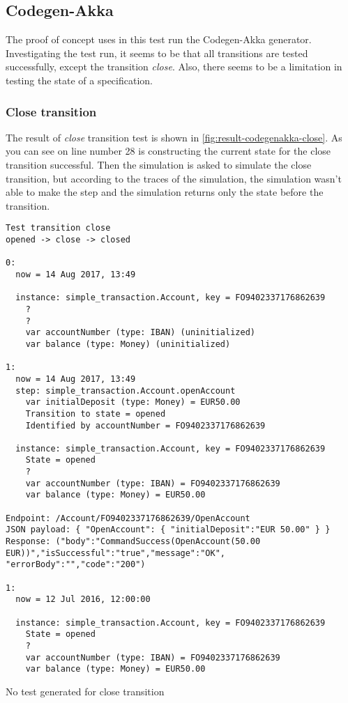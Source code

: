 \subsection{Codegen-Akka}
The proof of concept uses in this test run the Codegen-Akka generator.
Investigating the test run, it seems to be that all transitions are tested
successfully, except the transition \textit{close}. Also, there seems to be a
limitation in testing the state of a specification.

\subsubsection{Close transition}
\label{sec:close-no-test-codegenakka}

The result of \textit{close} transition test is shown in
\autoref{fig:result-codegenakka-close}. As you can see on line number 28 is
constructing the current state for the close transition successful. Then the
simulation is asked to simulate the close transition, but according to the
traces of the simulation, the simulation wasn't able to make the step and the
simulation returns only the state before the transition.

\begin{sourcecode}[h!]
\begin{lstlisting}[]
Test transition close
opened -> close -> closed

0:
  now = 14 Aug 2017, 13:49

  instance: simple_transaction.Account, key = FO9402337176862639
    ?
    ?
    var accountNumber (type: IBAN) (uninitialized)
    var balance (type: Money) (uninitialized)

1:
  now = 14 Aug 2017, 13:49
  step: simple_transaction.Account.openAccount
    var initialDeposit (type: Money) = EUR50.00
    Transition to state = opened
    Identified by accountNumber = FO9402337176862639

  instance: simple_transaction.Account, key = FO9402337176862639
    State = opened
    ?
    var accountNumber (type: IBAN) = FO9402337176862639
    var balance (type: Money) = EUR50.00

Endpoint: /Account/FO9402337176862639/OpenAccount
JSON payload: { "OpenAccount": { "initialDeposit":"EUR 50.00" } }
Response: ("body":"CommandSuccess(OpenAccount(50.00 EUR))","isSuccessful":"true","message":"OK",
"errorBody":"","code":"200")

1:
  now = 12 Jul 2016, 12:00:00

  instance: simple_transaction.Account, key = FO9402337176862639
    State = opened
    ?
    var accountNumber (type: IBAN) = FO9402337176862639
    var balance (type: Money) = EUR50.00
\end{lstlisting}
\caption{No test generated for close transition}
\label{fig:result-codegenakka-close}
\end{sourcecode}


